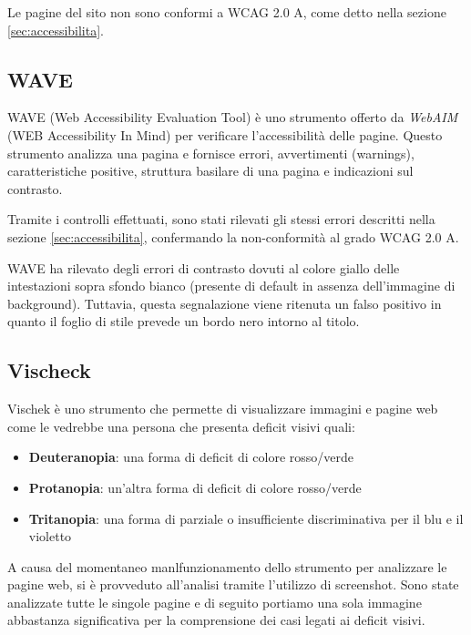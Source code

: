 Le pagine del sito non sono conformi a WCAG 2.0 A, come detto nella sezione
\ref{sec:accessibilita}.

\subsection{WAVE} %
WAVE (Web Accessibility Evaluation Tool) è uno strumento offerto da
\textit{WebAIM} (WEB Accessibility In Mind) per verificare l'accessibilità
delle pagine. Questo strumento analizza una pagina e fornisce errori,
avvertimenti (warnings), caratteristiche positive, struttura basilare di una
pagina e indicazioni sul contrasto.

Tramite i controlli effettuati, sono stati rilevati gli stessi errori
descritti nella sezione \ref{sec:accessibilita}, confermando la non-conformità
al grado WCAG 2.0 A.

WAVE ha rilevato degli errori di contrasto dovuti al colore giallo delle
intestazioni sopra sfondo bianco (presente di default in assenza dell'immagine
di background). Tuttavia, questa segnalazione viene ritenuta un falso positivo
in quanto il foglio di stile prevede un bordo nero intorno al titolo.

\subsection{Vischeck} %
Vischek è uno strumento che permette di visualizzare immagini e pagine web
come le vedrebbe una persona che presenta deficit visivi quali:
\begin{itemize}
\item \textbf{Deuteranopia}: una forma di deficit di colore rosso/verde
\item \textbf{Protanopia}: un'altra forma di deficit di colore rosso/verde
\item \textbf{Tritanopia}: una forma di parziale o insufficiente
discriminativa per il blu e il violetto
\end{itemize}
A causa del momentaneo manlfunzionamento dello strumento per analizzare le
pagine web, si è provveduto all'analisi tramite l'utilizzo di screenshot. Sono
state analizzate tutte le singole pagine e di seguito portiamo una sola
immagine abbastanza significativa per la comprensione dei casi legati ai
deficit visivi.

